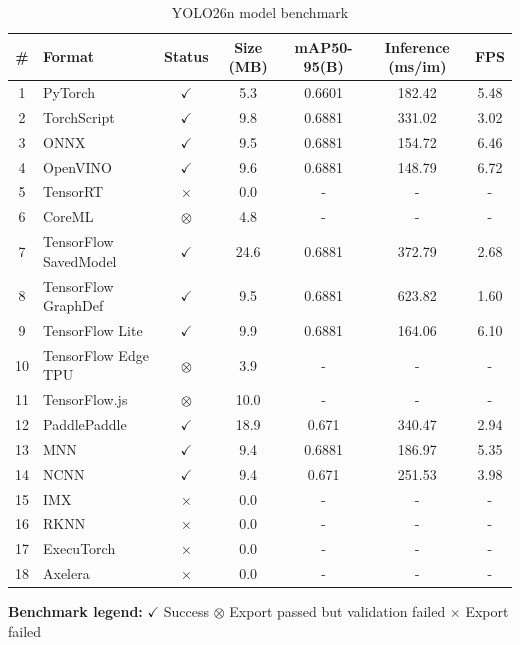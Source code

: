 \begin{table}[h!]
	\begin{tabular}{clccccc}
		\toprule
		\# & Format & Status & Size (MB) & mAP50-95(B) & Inference (ms/im) & FPS \\
		\midrule
		1  & PyTorch               & $\checkmark$ & 5.3  & 0.6601 & 182.42 & 5.48 \\
		2  & TorchScript           & $\checkmark$ & 9.8  & 0.6881 & 331.02 & 3.02 \\
		3  & ONNX                  & $\checkmark$ & 9.5  & 0.6881 & 154.72 & 6.46 \\
		4  & OpenVINO              & $\checkmark$ & 9.6  & 0.6881 & 148.79 & 6.72 \\
		5  & TensorRT              & $\times$     & 0.0  & -      & -      & -    \\
		6  & CoreML                & $\otimes$    & 4.8  & -      & -      & -    \\
		7  & TensorFlow SavedModel & $\checkmark$ & 24.6 & 0.6881 & 372.79 & 2.68 \\
		8  & TensorFlow GraphDef   & $\checkmark$ & 9.5  & 0.6881 & 623.82 & 1.60 \\
		9  & TensorFlow Lite       & $\checkmark$ & 9.9  & 0.6881 & 164.06 & 6.10 \\
		10 & TensorFlow Edge TPU   & $\otimes$    & 3.9  & -      & -      & -    \\
		11 & TensorFlow.js         & $\otimes$    & 10.0 & -      & -      & -    \\
		12 & PaddlePaddle          & $\checkmark$ & 18.9 & 0.671  & 340.47 & 2.94 \\
		13 & MNN                   & $\checkmark$ & 9.4  & 0.6881 & 186.97 & 5.35 \\
		14 & NCNN                  & $\checkmark$ & 9.4  & 0.671  & 251.53 & 3.98 \\
		15 & IMX                   & $\times$     & 0.0  & -      & -      & -    \\
		16 & RKNN                  & $\times$     & 0.0  & -      & -      & -    \\
		17 & ExecuTorch            & $\times$     & 0.0  & -      & -      & -    \\
		18 & Axelera               & $\times$     & 0.0  & -      & -      & -    \\
		\bottomrule
	\end{tabular}

	\vspace{2mm}
	\footnotesize
	\textbf{Benchmark legend:} $\checkmark$ Success \quad
	$\otimes$ Export passed but validation failed \quad
	$\times$ Export failed

	\caption{YOLO26n model benchmark}
\end{table}

